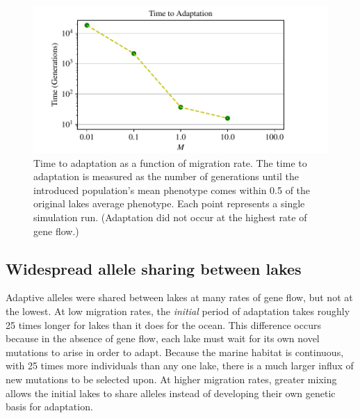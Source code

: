 \documentclass{article}
\begin{document}
\begin{figure}
    \begin{center}
          \includegraphics{Final_Plots/Time_Adapt.pdf}
          \caption{
            Time to adaptation as a function of migration rate.
            The time to adaptation is measured as the number of generations until
            the introduced population's mean phenotype 
            comes within 0.5 of the original lakes average phenotype. 
            Each point represents a single simulation run.
            (Adaptation did not occur at the highest rate of gene flow.)
        } \label{fig:TimeToAdaptation}
    \end{center}
\end{figure}

\subsection*{Widespread allele sharing between lakes}

Adaptive alleles were shared between lakes at many rates of gene flow, but not at the lowest.
At low migration rates, the \emph{initial} period of adaptation takes roughly 25 times longer for lakes than it does for the ocean. 
This difference occurs because in the absence of gene flow, each lake must wait for its own novel mutations to arise in order to adapt. 
Because the marine habitat is continuous, with 25 times more individuals than any one lake, there is a much larger influx of new mutations to be selected upon. 
At higher migration rates, greater mixing allows the initial lakes to share alleles instead of developing their own genetic basis for adaptation. 
\end{document}
